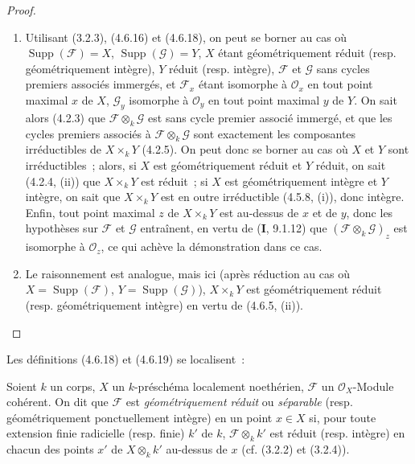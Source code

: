 \begin{proof}
\begin{enumerate}
\item[(i)] Utilisant (3.2.3), (4.6.16) et (4.6.18), on peut se borner au cas où
$\operatorname{Supp}(\mathscr F)=X$, $\operatorname{Supp}(\mathscr G)=Y$, $X$
étant géométriquement réduit (resp. géométriquement intègre), $Y$ réduit
(resp. intègre), $\mathscr F$ et $\mathscr G$ sans cycles premiers associés
immergés, et $\mathscr F_x$ étant isomorphe à $\mathcal O_x$ en tout point
maximal $x$ de $X$, $\mathscr G_y$ isomorphe à $\mathcal O_y$ en tout point
maximal $y$ de $Y$. On sait alors (4.2.3) que
$\mathscr F\otimes_k\mathscr G$ est sans cycle premier associé immergé, et que
les cycles premiers associés à $\mathscr F\otimes_k\mathscr G$ sont exactement
les composantes irréductibles de $X\times_k Y$ (4.2.5). On peut donc se borner
au cas où $X$ et $Y$ sont irréductibles~; alors, si $X$ est géométriquement
réduit et $Y$ réduit, on sait (4.2.4, (ii)) que $X\times_k Y$ est réduit~; si
$X$ est géométriquement intègre et $Y$ intègre, on sait que $X\times_k Y$ est
en outre irréductible (4.5.8, (i)), donc intègre. Enfin, tout point maximal $z$
de $X\times_k Y$ est au-dessus de $x$ et de $y$, donc les hypothèses sur
$\mathscr F$ et $\mathscr G$ entraînent, en vertu de (\textbf{I}, 9.1.12) que
$(\mathscr F\otimes_k\mathscr G)_z$ est isomorphe à $\mathcal O_z$, ce qui
achève la démonstration dans ce cas.

\item[(ii)] Le raisonnement est analogue, mais ici (après réduction au cas où
$X=\operatorname{Supp}(\mathscr F)$, $Y=\operatorname{Supp}(\mathscr G)$),
$X\times_k Y$ est géométriquement réduit (resp. géométriquement intègre) en
vertu de (4.6.5, (ii)).
\end{enumerate}
\end{proof}

Les définitions (4.6.18) et (4.6.19) se localisent~:

\begin{definition}[4.6.22]
\label{IV.2.4.6.22-fr}
Soient $k$ un corps, $X$ un $k$-préschéma localement noethérien, $\mathscr F$
un $\mathcal O_X$-Module cohérent. On dit que $\mathscr F$ est
\emph{géométriquement réduit} ou \emph{séparable} \textup{(resp. géométriquement
ponctuellement intègre)} en un point $x\in X$ si, pour toute extension finie
radicielle \textup{(resp.} finie) $k'$ de $k$, $\mathscr F\otimes_k k'$ est réduit
\textup{(resp.} intègre) en chacun des points $x'$ de $X\otimes_k k'$ au-dessus de $x$
\textup{(cf. (3.2.2) et (3.2.4))}.
\end{definition}

